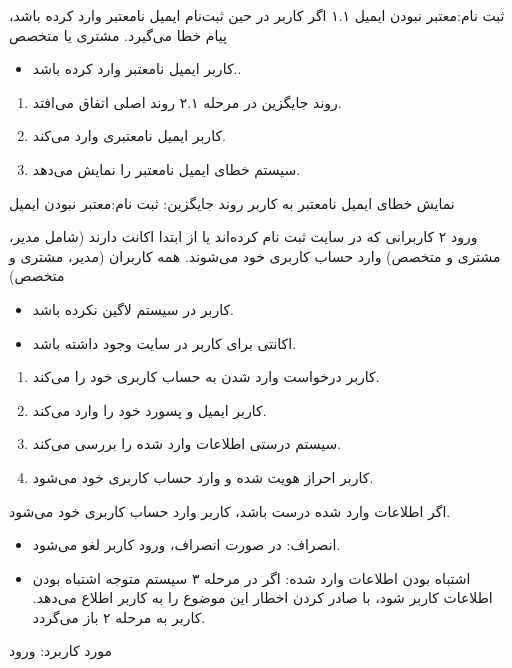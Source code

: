\alternativeflow
{
	ثبت‌ نام:معتبر نبودن ایمیل
}
{۱.۱}
{
	اگر کاربر در حین ثبت‌نام ایمیل نامعتبر وارد کرده باشد، پیام خطا می‌گیرد.
}
{
	مشتری یا متخصص
}
{}
{
	\begin{itemize}
	
		\item
		کاربر ایمیل نامعتبر وارد کرده باشد..
	\end{itemize}
}
{
	\vspace*{-0.6cm}
	\begin{enumerate}
		\item 
		روند جایگزین در مرحله ۲.۱ روند اصلی اتفاق می‌افتد.
		\item
		کاربر ایمیل نامعتبری وارد می‌کند.
		\item 
		سیستم خطای ایمیل نامعتبر را نمایش می‌دهد.
	\end{enumerate}
}
{
	نمایش خطای ایمیل نامعتبر به کاربر
}
{
	روند جایگزین: 	ثبت‌ نام:معتبر نبودن ایمیل
}




\usecase
{ورود}
{۲}
{کاربرانی که در سایت ثبت‌ نام کرده‌اند یا از ابتدا اکانت دارند (شامل مدیر، مشتری و متخصص) وارد حساب کاربری خود می‌شوند.}
{همه کاربران (مدیر، مشتری و متخصص)}
{}
{
		\begin{itemize}
		\item
		کاربر در سیستم لاگین نکرده باشد.
		\item
		اکانتی برای کاربر در سایت وجود داشته باشد.
	\end{itemize}
	
}
{
\begin{enumerate}
	\item 
	کاربر درخواست وارد شدن به حساب کاربری خود را می‌کند.
	
	
	\item 
	کاربر ایمیل و پسورد خود را وارد می‌کند.
	
	\item
	سیستم درستی اطلاعات وارد شده را بررسی می‌کند.
	
	\item
	کاربر احراز هویت شده و وارد حساب کاربری خود می‌شود.
\end{enumerate}
}{اگر اطلاعات وارد شده درست باشد، کاربر وارد حساب کاربری خود می‌شود.}
{	
	
	\begin{itemize}
	\item
	 انصراف: در صورت انصراف، ورود کاربر لغو می‌شود.
	
	\item
	اشتباه بودن اطلاعات وارد شده: اگر در مرحله ۳ سیستم متوجه اشتباه بودن اطلاعات کاربر شود، با صادر کردن اخطار این موضوع را به کاربر اطلاع می‌دهد. کاربر به مرحله ۲ باز می‌گردد.
	\end{itemize}
}
{مورد کاربرد: ورود }



